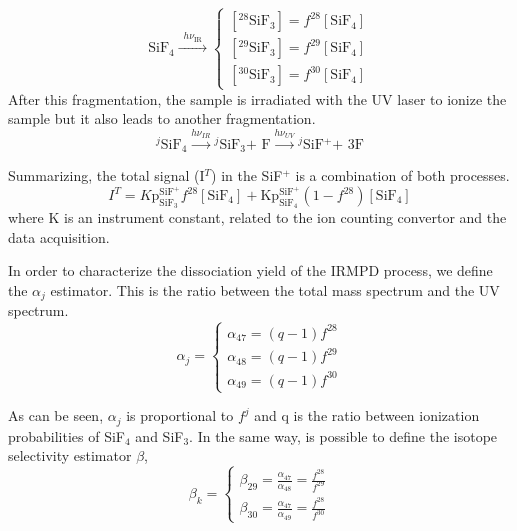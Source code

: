 \documentclass[global,twocolumn]{svjour}
\begin{document}
\begin{equation}
\text{SiF$_{4}$} \xrightarrow{\,\,\, h\nu_{\text{IR}} \,\,\,}
\begin{cases}
[^{28}\text{SiF$_{3}$}] = f^{28}[\text{SiF$_{4}$} ] \\
[^{29}\text{SiF$_{3}$}] = f^{29}[\text{SiF$_{4}$} ] \\
[^{30}\text{SiF$_{3}$}] = f^{30}[\text{SiF$_{4}$} ]
\end{cases}
\end{equation}
After this fragmentation, the sample is irradiated with the UV laser to ionize the sample but it also leads to another fragmentation. 
\begin{equation}
\text{$^{j}$SiF$_{4}$} \xrightarrow{h \nu_{IR}} \text{$^{j}$SiF$_{3}$+ F} \xrightarrow{h \nu_{UV}} \text{$^{j}$SiF$^{+}$+ 3F}  
\end{equation}

Summarizing, the total signal (I$^{T}$) in the SiF$^{+}$ is a combination of both processes. 
\begin{equation}
I^{T} = K \text{p}_{\text{SiF$_{3}$}}^{\text{SiF$^{+}$}} f^{28}[\text{SiF$_{4}$}] + \text{K} \text{p}_{\text{SiF$_{4}$}}^{\text{SiF$^{+}$}} (1-f^{28})[\text{SiF$_{4}$}]
\end{equation}
where K is an instrument constant, related to the ion counting convertor and the data acquisition.

In order to characterize the dissociation yield of the IRMPD process, we define the $\alpha_{j}$ estimator. This is the ratio between the total mass spectrum and the UV spectrum.
\begin{equation}
\alpha_{j} = 
\begin{cases}
\alpha_{47} = (q-1)f^{28} \\
\alpha_{48} = (q-1)f^{29} \\
\alpha_{49} = (q-1)f^{30}
\end{cases}
\end{equation}

As can be seen, $\alpha_{j}$ is proportional to $f^{j}$ and q is the ratio between ionization probabilities of SiF$_{4}$ and SiF$_{3}$. In the same way, is possible to define the isotope selectivity estimator $\beta$,
\begin{equation}
\beta_{k} = 
\begin{cases}
\beta_{29} = \frac{\alpha_{47}}{\alpha_{48}} = \frac{f^{28}}{f^{29}} \\
\beta_{30} = \frac{\alpha_{47}}{\alpha_{49}} = \frac{f^{28}}{f^{30}}
\end{cases}
\end{equation}
\end{document}
